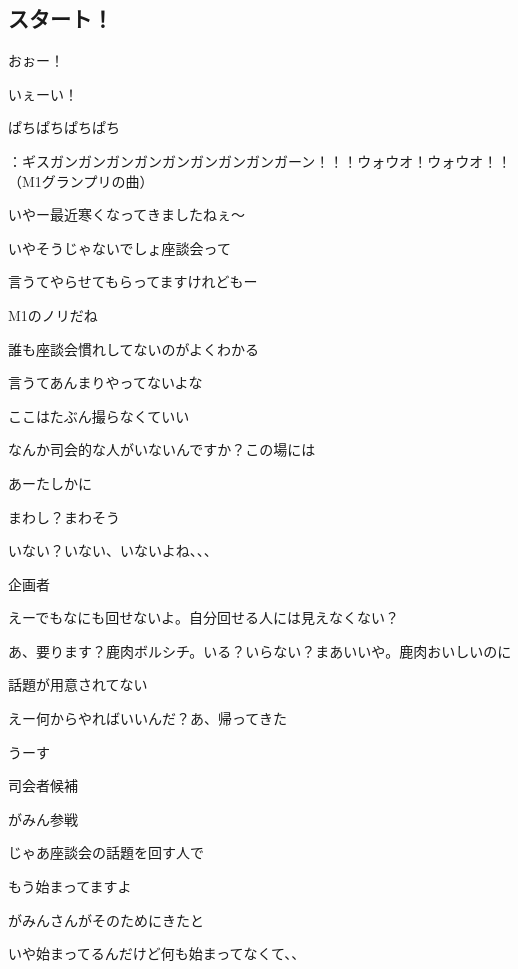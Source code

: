 \begin{multicols}{2}
  


  \subsection{スタート！}

  おぉー！

  いぇーい！

  ぱちぱちぱちぱち

  ：ギスガンガンガンガンガンガンガンガンガーン！！！ウォウオ！ウォウオ！！（M1グランプリの曲）

  いやー最近寒くなってきましたねぇ～

  いやそうじゃないでしょ座談会って

  言うてやらせてもらってますけれどもー

  M1のノリだね

  誰も座談会慣れしてないのがよくわかる

  言うてあんまりやってないよな

  ここはたぶん撮らなくていい

  なんか司会的な人がいないんですか？この場には

  あーたしかに

  まわし？まわそう

  いない？いない、いないよね、、、

  企画者

  えーでもなにも回せないよ。自分回せる人には見えなくない？

  あ、要ります？鹿肉ボルシチ。いる？いらない？まあいいや。鹿肉おいしいのに

  話題が用意されてない

  えー何からやればいいんだ？あ、帰ってきた

  うーす

  司会者候補

  がみん参戦

  じゃあ座談会の話題を回す人で

  もう始まってますよ

  がみんさんがそのためにきたと

  いや始まってるんだけど何も始まってなくて、、


\end{multicols}
